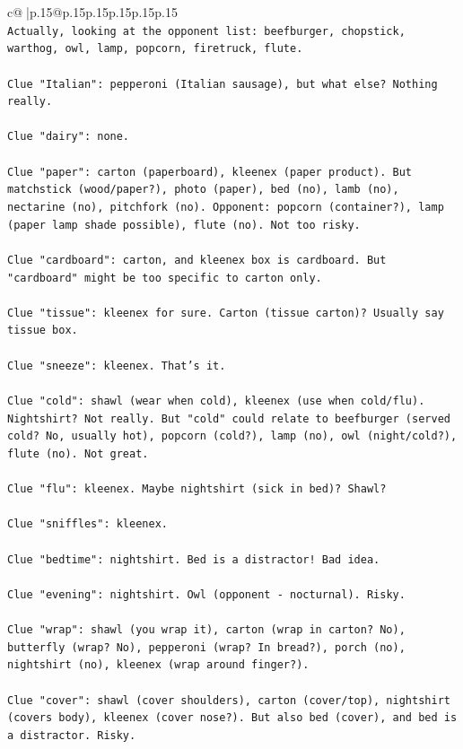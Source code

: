 \documentclass{article}
\begin{document}
{\begin{supertabular}{c@{$\;$}|p{.15\linewidth}@{}p{.15\linewidth}p{.15\linewidth}p{.15\linewidth}p{.15\linewidth}p{.15\linewidth}}
{{{\\ 
\texttt{Actually, looking at the opponent list: beefburger, chopstick, warthog, owl, lamp, popcorn, firetruck, flute.} \\
\\ 
\texttt{Clue "Italian": pepperoni (Italian sausage), but what else? Nothing really.} \\
\\ 
\texttt{Clue "dairy": none.} \\
\\ 
\texttt{Clue "paper": carton (paperboard), kleenex (paper product). But matchstick (wood/paper?), photo (paper), bed (no), lamb (no), nectarine (no), pitchfork (no). Opponent: popcorn (container?), lamp (paper lamp shade possible), flute (no). Not too risky.} \\
\\ 
\texttt{Clue "cardboard": carton, and kleenex box is cardboard. But "cardboard" might be too specific to carton only.} \\
\\ 
\texttt{Clue "tissue": kleenex for sure. Carton (tissue carton)? Usually say tissue box.} \\
\\ 
\texttt{Clue "sneeze": kleenex. That's it.} \\
\\ 
\texttt{Clue "cold": shawl (wear when cold), kleenex (use when cold/flu). Nightshirt? Not really. But "cold" could relate to beefburger (served cold? No, usually hot), popcorn (cold?), lamp (no), owl (night/cold?), flute (no). Not great.} \\
\\ 
\texttt{Clue "flu": kleenex. Maybe nightshirt (sick in bed)? Shawl?} \\
\\ 
\texttt{Clue "sniffles": kleenex.} \\
\\ 
\texttt{Clue "bedtime": nightshirt. Bed is a distractor! Bad idea.} \\
\\ 
\texttt{Clue "evening": nightshirt. Owl (opponent {-} nocturnal). Risky.} \\
\\ 
\texttt{Clue "wrap": shawl (you wrap it), carton (wrap in carton? No), butterfly (wrap? No), pepperoni (wrap? In bread?), porch (no), nightshirt (no), kleenex (wrap around finger?).} \\
\\ 
\texttt{Clue "cover": shawl (cover shoulders), carton (cover/top), nightshirt (covers body), kleenex (cover nose?). But also bed (cover), and bed is a distractor. Risky.} \\
}}}
\end{supertabular}}
\end{document}
